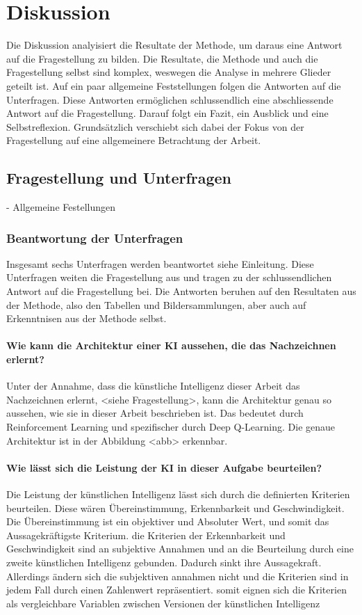 \chapter{Diskussion}
Die Diskussion analyisiert die Resultate der Methode, um daraus eine Antwort auf
die Fragestellung zu bilden. Die Resultate, die Methode und auch die
Fragestellung selbst sind komplex, weswegen die Analyse in mehrere Glieder
geteilt ist. Auf ein paar allgemeine Feststellungen folgen die Antworten auf die
Unterfragen. Diese Antworten ermöglichen schlussendlich eine abschliessende
Antwort auf die Fragestellung. Darauf folgt ein Fazit, ein Ausblick und eine
Selbstreflexion. Grundsätzlich verschiebt sich dabei der Fokus von der
Fragestellung auf eine allgemeinere Betrachtung der Arbeit.

\section{Fragestellung und Unterfragen}
- Allgemeine Festellungen

\subsection{Beantwortung der Unterfragen}
Insgesamt sechs Unterfragen werden beantwortet {siehe Einleitung}. Diese
Unterfragen weiten die Fragestellung aus und tragen zu der schlussendlichen
Antwort auf die Fragestellung bei. Die Antworten beruhen auf den Resultaten aus
der Methode, also den Tabellen und Bildersammlungen, aber auch auf Erkenntnisen
aus der Methode selbst.

\subsubsection*{Wie kann die Architektur einer KI aussehen, die das Nachzeichnen erlernt?}
Unter der Annahme, dass die künstliche Intelligenz dieser Arbeit das
Nachzeichnen erlernt, <siehe Fragestellung>, kann die Architektur genau so
aussehen, wie sie in dieser Arbeit beschrieben ist. Das bedeutet durch
Reinforcement Learning und spezifischer durch Deep Q-Learning. Die genaue
Architektur ist in der Abbildung <abb> erkennbar.

\subsubsection*{Wie lässt sich die Leistung der KI in dieser Aufgabe beurteilen?}
Die Leistung der künstlichen Intelligenz lässt sich durch die definierten
Kriterien beurteilen. Diese wären Übereinstimmung, Erkennbarkeit und
Geschwindigkeit. Die Übereinstimmung ist ein objektiver und Absoluter Wert,
und somit das Aussagekräftigste Kriterium. die Kriterien der Erkennbarkeit
und Geschwindigkeit sind an subjektive Annahmen und an die Beurteilung durch
eine zweite künstlichen Intelligenz gebunden. Dadurch sinkt ihre
Aussagekraft. Allerdings ändern sich die subjektiven annahmen nicht und die
Kriterien sind in jedem Fall durch einen Zahlenwert repräsentiert. somit
eignen sich die Kriterien als vergleichbare Variablen zwischen Versionen der künstlichen Intelligenz

